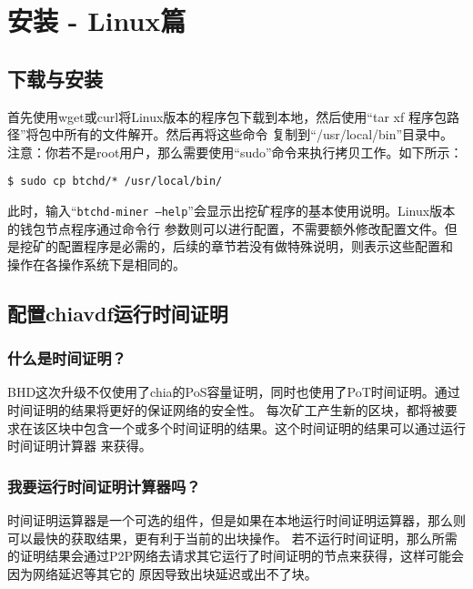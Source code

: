 \section{安装 - Linux篇}
\subsection{下载与安装}
\begin{flushleft}
    首先使用wget或curl将Linux版本的程序包下载到本地，然后使用``tar xf 程序包路径''将包中所有的文件解开。然后再将这些命令
    复制到``/usr/local/bin''目录中。注意：你若不是root用户，那么需要使用``sudo''命令来执行拷贝工作。如下所示：
\end{flushleft}
\scriptsize
\begin{verbatim}
$ sudo cp btchd/* /usr/local/bin/
\end{verbatim}
\normalsize
\begin{flushleft}
    此时，输入``\texttt{btchd-miner --help}''会显示出挖矿程序的基本使用说明。Linux版本的钱包节点程序通过命令行
    参数则可以进行配置，不需要额外修改配置文件。但是挖矿的配置程序是必需的，后续的章节若没有做特殊说明，则表示这些配置和
    操作在各操作系统下是相同的。
\end{flushleft}
\subsection{配置chiavdf运行时间证明}
\subsubsection{什么是时间证明？}
\begin{flushleft}
    BHD这次升级不仅使用了chia的PoS容量证明，同时也使用了PoT时间证明。通过时间证明的结果将更好的保证网络的安全性。
    每次矿工产生新的区块，都将被要求在该区块中包含一个或多个时间证明的结果。这个时间证明的结果可以通过运行时间证明计算器
    来获得。
\end{flushleft}
\subsubsection{我要运行时间证明计算器吗？}
\begin{flushleft}
    时间证明运算器是一个可选的组件，但是如果在本地运行时间证明运算器，那么则可以最快的获取结果，更有利于当前的出块操作。
    若不运行时间证明，那么所需的证明结果会通过P2P网络去请求其它运行了时间证明的节点来获得，这样可能会因为网络延迟等其它的
    原因导致出块延迟或出不了块。
\end{flushleft}
